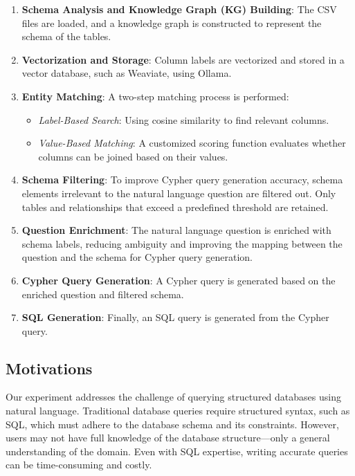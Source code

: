 \begin{enumerate}
    \item \textbf{Schema Analysis and Knowledge Graph (KG) Building}:  
    The CSV files are loaded, and a knowledge graph is constructed to represent the schema of the tables.

    \item \textbf{Vectorization and Storage}:  
    Column labels are vectorized and stored in a vector database, such as Weaviate, using Ollama.

    \item \textbf{Entity Matching}:  
    A two-step matching process is performed:  
    \begin{itemize}
        \item \textit{Label-Based Search}: Using cosine similarity to find relevant columns.  
        \item \textit{Value-Based Matching}: A customized scoring function evaluates whether columns can be joined based on their values.
    \end{itemize}

    \item \textbf{Schema Filtering}:  
    To improve Cypher query generation accuracy, schema elements irrelevant to the natural language question are filtered out. Only tables and relationships that exceed a predefined threshold are retained.

    \item \textbf{Question Enrichment}:  
    The natural language question is enriched with schema labels, reducing ambiguity and improving the mapping between the question and the schema for Cypher query generation.

    \item \textbf{Cypher Query Generation}:  
    A Cypher query is generated based on the enriched question and filtered schema.

    \item \textbf{SQL Generation}:  
    Finally, an SQL query is generated from the Cypher query.
\end{enumerate}


\subsection{Motivations}
Our experiment addresses the challenge of querying structured databases using natural language. Traditional database queries require structured syntax, such as SQL, which must adhere to the database schema and its constraints. However, users may not have full knowledge of the database structure—only a general understanding of the domain. Even with SQL expertise, writing accurate queries can be time-consuming and costly.  

